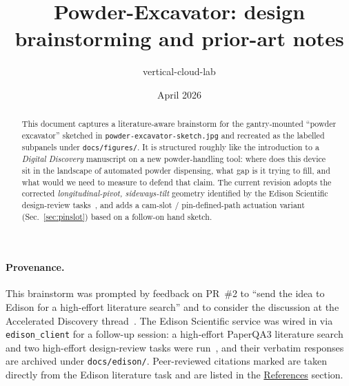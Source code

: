 \documentclass[11pt,a4paper]{article}
\title{Powder-Excavator: design brainstorming and prior-art notes}
\author{vertical-cloud-lab}
\date{April 2026}
\begin{document}
\maketitle

\begin{abstract}
\noindent
This document captures a literature-aware brainstorm for the gantry-mounted
``powder excavator'' sketched in \texttt{powder-excavator-sketch.jpg} and
recreated as the labelled subpanels under \texttt{docs/figures/}. It is
structured roughly like the introduction to a \emph{Digital Discovery}
manuscript on a new powder-handling tool: where does this device sit in the
landscape of automated powder dispensing, what gap is it trying to fill, and
what would we need to measure to defend that claim. The current revision
adopts the corrected \emph{longitudinal-pivot, sideways-tilt} geometry
identified by the Edison Scientific design-review tasks~\cite{edisonscientific},
and adds a cam-slot / pin-defined-path actuation variant (Sec.~\ref{sec:pinslot})
based on a follow-on hand sketch.
\end{abstract}

\paragraph{Provenance.}
This brainstorm was prompted by feedback on PR~\#2 to ``send the idea to
Edison for a high-effort literature search'' and to consider the discussion
at the Accelerated Discovery
thread~\cite{accdiscthread}. The Edison Scientific service was wired in via
\texttt{edison\_client} for a follow-up session: a high-effort PaperQA3
literature search and two high-effort design-review tasks were
run~\cite{edisonscientific}, and their verbatim responses are archived under
\texttt{docs/edison/}. Peer-reviewed citations marked
\cite{tom2024selfdrivinglaboratoriesfor,yang2007meteringanddispensing,bahr2018collaborativeevaluationof,bahr2020recentadvancesin,jiang2023autonomousbiomimeticsolid,szymanski2023anautonomouslaboratory,szymanski2024automatingthesynthesis,fei2024alabosapythonbased,lunt2023modularmultirobotintegration,lunt2024aroboticworkflow,carruthers2025amobilerobotic,alsenz2011powderpickinganinexpensive,hernandezdelvalle2024pelletdispensomixerand,doloi2025democratizingselfdrivinglabs,moravkar2020traditionalandadvanced,freeman2017characterisingpowderflow,ghoroi2013multifacetedcharacterizationof,mccalla2023semiautomatedexperimentsto}
are taken directly from the Edison literature task and are listed in the
\hyperref[sec:references]{References} section.
\end{document}
